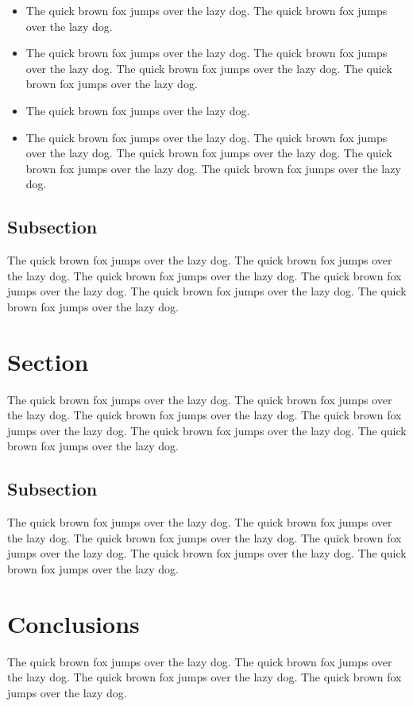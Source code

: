 \documentclass[conference]{IEEEtran}
\begin{document}
\begin{itemize}
    \item The quick brown fox jumps over the lazy dog. The quick brown fox jumps over the lazy dog.
    \item The quick brown fox jumps over the lazy dog. The quick brown fox jumps over the lazy dog. The quick brown fox jumps over the lazy dog. The quick brown fox jumps over the lazy dog. 
    \item The quick brown fox jumps over the lazy dog.
    \item The quick brown fox jumps over the lazy dog. The quick brown fox jumps over the lazy dog. The quick brown fox jumps over the lazy dog. The quick brown fox jumps over the lazy dog. The quick brown fox jumps over the lazy dog. 
\end{itemize}

\subsection{Subsection}
\label{subsec:sec2}
The quick brown fox jumps over the lazy dog. The quick brown fox jumps over the lazy dog. The quick brown fox jumps over the lazy dog. The quick brown fox jumps over the lazy dog. The quick brown fox jumps over the lazy dog. The quick brown fox jumps over the lazy dog. 

\section{Section}
\label{sec:sec2}
The quick brown fox jumps over the lazy dog. The quick brown fox jumps over the lazy dog. The quick brown fox jumps over the lazy dog. The quick brown fox jumps over the lazy dog. The quick brown fox jumps over the lazy dog. The quick brown fox jumps over the lazy dog. 

\subsection{Subsection}
\label{subsec:sec2}
The quick brown fox jumps over the lazy dog. The quick brown fox jumps over the lazy dog. The quick brown fox jumps over the lazy dog. The quick brown fox jumps over the lazy dog. The quick brown fox jumps over the lazy dog. The quick brown fox jumps over the lazy dog. 

\section{Conclusions}
\label{sec:conc}
The quick brown fox jumps over the lazy dog. The quick brown fox jumps over the lazy dog. The quick brown fox jumps over the lazy dog. The quick brown fox jumps over the lazy dog.

\printbibliography[title={References}]
\end{document}
